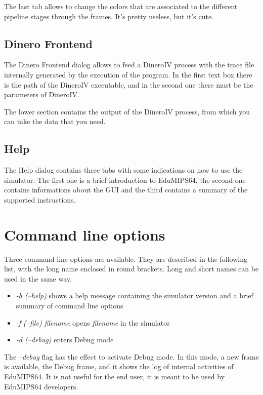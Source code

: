 \documentclass[letterpaper,10pt,english]{sphinxmanual}
\begin{document}
The last tab allows to change the colors that are associated to the different
pipeline stages through the frames. It's pretty useless, but it's cute.


\subsection{Dinero Frontend}
\label{user-interface:dinero-frontend}
The Dinero Frontend dialog allows to feed a DineroIV process with the trace file
internally generated by the execution of the program. In the first text box
there is the path of the DineroIV executable, and in the second one there must
be the parameters of DineroIV.

The lower section contains the output of the DineroIV process, from which you
can take the data that you need.


\subsection{Help}
\label{user-interface:id1}
The Help dialog contains three tabs with some indications on how to use the
simulator. The first one is a brief introduction to EduMIPS64, the second one contains
informations about the GUI and the third contains a summary of the supported
instructions.


\section{Command line options}
\label{user-interface:command-line-options}
Three command line options are available. They are described in the following
list, with the long name enclosed in round brackets. Long and short names can be
used in the same way.
\begin{itemize}
\item {} 
\emph{-h (--help)} shows a help message containing the
simulator version and a brief summary of command line options

\item {} 
\emph{-f (--file) filename} opens \emph{filename} in the simulator

\item {} 
\emph{-d (--debug)} enters Debug mode

\end{itemize}

The \emph{--debug} flag has the effect to activate Debug mode. In this mode, a
new frame is available, the Debug frame, and it shows the log of internal
activities of EduMIPS64. It is not useful for the end user, it is meant to be used by
EduMIPS64 developers.
\end{document}
